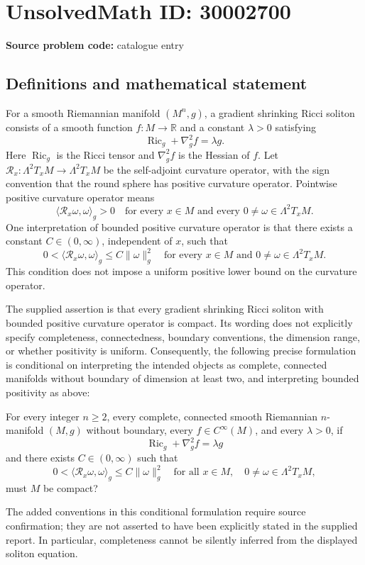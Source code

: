 \documentclass[11pt]{article}
\newcommand{\R}{\mathbb{R}}
\begin{document}
\section*{UnsolvedMath ID: 30002700}
\textbf{Source problem code:} catalogue entry
\subsection{Definitions and mathematical statement}
For a smooth Riemannian manifold \((M^n,g)\), a gradient shrinking Ricci soliton consists of a smooth function \(f\colon M\to\R\) and a constant \(\lambda>0\) satisfying
\[
\operatorname{Ric}_g+\nabla_g^2 f=\lambda g.
\]
Here \(\operatorname{Ric}_g\) is the Ricci tensor and \(\nabla_g^2 f\) is the Hessian of \(f\). Let \(\mathcal R_x\colon\Lambda^2T_xM\to\Lambda^2T_xM\) be the self-adjoint curvature operator, with the sign convention that the round sphere has positive curvature operator. Pointwise positive curvature operator means
\[
\langle\mathcal R_x\omega,\omega\rangle_g>0
\quad\text{for every }x\in M\text{ and every }0\ne\omega\in\Lambda^2T_xM.
\]
One interpretation of bounded positive curvature operator is that there exists a constant \(C\in(0,\infty)\), independent of \(x\), such that
\[
0<\langle\mathcal R_x\omega,\omega\rangle_g\le C\lVert\omega\rVert_g^2
\quad\text{for every }x\in M\text{ and }0\ne\omega\in\Lambda^2T_xM.
\]
This condition does not impose a uniform positive lower bound on the curvature operator.

The supplied assertion is that every gradient shrinking Ricci soliton with bounded positive curvature operator is compact. Its wording does not explicitly specify completeness, connectedness, boundary conventions, the dimension range, or whether positivity is uniform. Consequently, the following precise formulation is conditional on interpreting the intended objects as complete, connected manifolds without boundary of dimension at least two, and interpreting bounded positivity as above:

For every integer \(n\ge2\), every complete, connected smooth Riemannian \(n\)-manifold \((M,g)\) without boundary, every \(f\in C^\infty(M)\), and every \(\lambda>0\), if
\[
\operatorname{Ric}_g+\nabla_g^2 f=\lambda g
\]
and there exists \(C\in(0,\infty)\) such that
\[
0<\langle\mathcal R_x\omega,\omega\rangle_g\le C\lVert\omega\rVert_g^2
\quad\text{for all }x\in M,\quad 0\ne\omega\in\Lambda^2T_xM,
\]
must \(M\) be compact?

The added conventions in this conditional formulation require source confirmation; they are not asserted to have been explicitly stated in the supplied report. In particular, completeness cannot be silently inferred from the displayed soliton equation.
\end{document}
